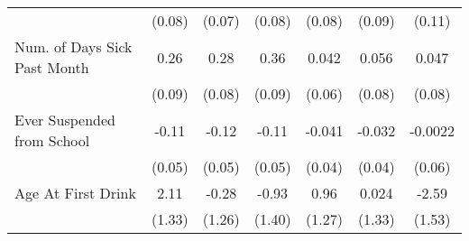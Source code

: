 {\begin{tabular}{l*{6}{c}}
            &      (0.08)         &      (0.07)         &      (0.08)         &      (0.08)         &      (0.09)         &      (0.11)         \\
\addlinespace
Num. of Days Sick Past Month&        0.26\sym{**} &        0.28\sym{***}&        0.36\sym{***}&       0.042         &       0.056         &       0.047         \\
            &      (0.09)         &      (0.08)         &      (0.09)         &      (0.06)         &      (0.08)         &      (0.08)         \\
\addlinespace
Ever Suspended from School&       -0.11\sym{*}  &       -0.12\sym{*}  &       -0.11\sym{*}  &      -0.041         &      -0.032         &     -0.0022         \\
            &      (0.05)         &      (0.05)         &      (0.05)         &      (0.04)         &      (0.04)         &      (0.06)         \\
\addlinespace
Age At First Drink&        2.11         &       -0.28         &       -0.93         &        0.96         &       0.024         &       -2.59         \\
            &      (1.33)         &      (1.26)         &      (1.40)         &      (1.27)         &      (1.33)         &      (1.53)         \\
\bottomrule
\end{tabular}
}
